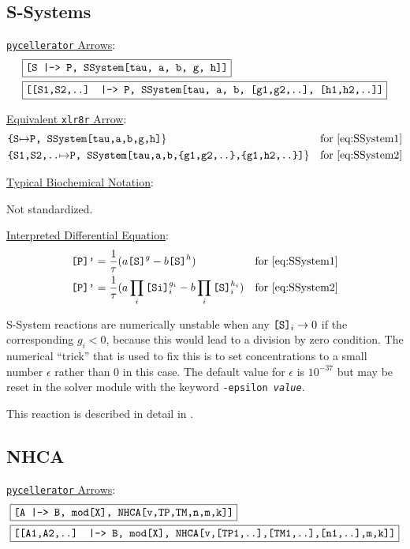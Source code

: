 \subsection{S-Systems}
\label{section:SSystem}
\underline{{\tt pycellerator} Arrows}:
\begin{align}
&\boxed{\text{\tt{[S |-> P, SSystem[tau, a, b, g, h]]}}} \label{eq:SSystem1}\\
&\boxed{\text{\tt{[[S1,S2,..] |-> P, SSystem[tau, a, b, [g1,g2,..], [h1,h2,..]]}}} \label{eq:SSystem2}
\end{align}


\underline{Equivalent {\tt xlr8r} Arrow}: 
\begin{align*}
&\text{\tt{\{S}}{\mapsto}\text{\tt{P, }} \text{\tt{SSystem[tau,a,b,g,h]}}\} & \text{for \eqref{eq:SSystem1}}\\
&\text{\tt{\{S1,S2,..}}{\mapsto}\text{\tt{P, }} \text{\tt{SSystem[tau,a,b,\{g1,g2,..\},\{g1,h2,..\}]}}\}&\text{for \eqref{eq:SSystem2}}
\end{align*}



\underline{Typical Biochemical Notation}: 

Not standardized.

\underline{Interpreted Differential Equation}:
\begin{align}
&\text{\tt{[P]'}}=\dfrac{1}{\tau}(a\text{\tt{[S]}}^g-b\text{\tt{[S]}}^h)&\text{for \eqref{eq:SSystem1}}\\
&\text{\tt{[P]'}}=\dfrac{1}{\tau}(a\prod_i\text{\tt{[Si]}}_i^{g_i}-b\prod_i\text{\tt{[S]}}_i^{h_i})&\text{for \eqref{eq:SSystem2}}
\end{align}

S-System reactions are numerically unstable when any $\text{\tt{[S]}}_i\to 0$ if the corresponding $g_i < 0$, because this would lead to a division by zero condition. The numerical ``trick'' that is used to fix this is to set concentrations to a small number $\epsilon$ rather than $0$ in this case. The default value for $\epsilon$ is $10^{-37}$ but may be reset in the solver module with the keyword {\tt -epsilon \textit{value}}. 

This reaction is described in detail in \cite{SSYS1, SSYS2}.

\subsection{NHCA}
\label{section:NHCA}
\underline{{\tt pycellerator} Arrows}:
\begin{align}
&\boxed{\text{\tt{[A |-> B, mod[X], NHCA[v,TP,TM,n,m,k]]}}} \label{eq:NHCA1} \\
&\boxed{\text{\tt{[[A1,A2,..] |-> B, mod[X], NHCA[v,[TP1,..],[TM1,..],[n1,..],m,k]]}}} \label{eq:NHCA2}
\end{align}


